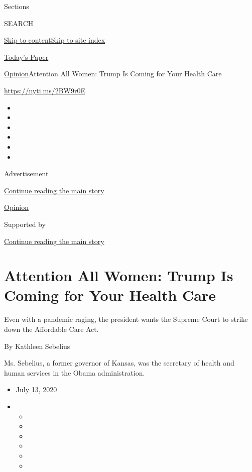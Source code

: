 Sections

SEARCH

\protect\hyperlink{site-content}{Skip to
content}\protect\hyperlink{site-index}{Skip to site index}

\href{https://myaccount.nytimes.com/auth/login?response_type=cookie\&client_id=vi}{}

\href{https://www.nytimes.com/section/todayspaper}{Today's Paper}

\href{/section/opinion}{Opinion}\textbar{}Attention All Women: Trump Is
Coming for Your Health Care

\href{https://nyti.ms/2BW9r0E}{https://nyti.ms/2BW9r0E}

\begin{itemize}
\item
\item
\item
\item
\item
\item
\end{itemize}

Advertisement

\protect\hyperlink{after-top}{Continue reading the main story}

\href{/section/opinion}{Opinion}

Supported by

\protect\hyperlink{after-sponsor}{Continue reading the main story}

\hypertarget{attention-all-women-trump-is-coming-for-your-health-care}{%
\section{Attention All Women: Trump Is Coming for Your Health
Care}\label{attention-all-women-trump-is-coming-for-your-health-care}}

Even with a pandemic raging, the president wants the Supreme Court to
strike down the Affordable Care Act.

By Kathleen Sebelius

Ms. Sebelius, a former governor of Kansas, was the secretary of health
and human services in the Obama administration.

\begin{itemize}
\item
  July 13, 2020
\item
  \begin{itemize}
  \item
  \item
  \item
  \item
  \item
  \item
  \end{itemize}
\end{itemize}

